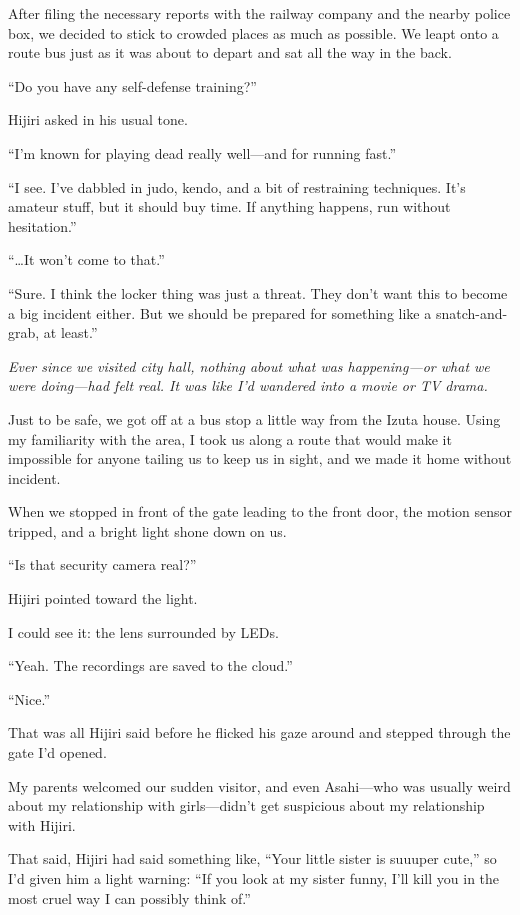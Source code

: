 \documentclass[
    a4paper,
    12pt,
    twoside,
    openany,
    UTF8,
    fontset=windows
]{ctexbook}
\begin{document}
After filing the necessary reports with the railway company and the nearby police box, we decided to stick to crowded places as much as possible. We leapt onto a route bus just as it was about to depart and sat all the way in the back.

``Do you have any self-defense training?''

Hijiri asked in his usual tone.

``I'm known for playing dead really well---and for running fast.''

``I see. I've dabbled in judo, kendo, and a bit of restraining techniques. It's amateur stuff, but it should buy time. If anything happens, run without hesitation.''

``\dots It won't come to that.''

``Sure. I think the locker thing was just a threat. They don't want this to become a big incident either. But we should be prepared for something like a snatch-and-grab, at least.''

\textit{Ever since we visited city hall, nothing about what was happening---or what we were doing---had felt real. It was like I'd wandered into a movie or TV drama.}

Just to be safe, we got off at a bus stop a little way from the Izuta house. Using my familiarity with the area, I took us along a route that would make it impossible for anyone tailing us to keep us in sight, and we made it home without incident.

When we stopped in front of the gate leading to the front door, the motion sensor tripped, and a bright light shone down on us.

``Is that security camera real?''

Hijiri pointed toward the light.

I could see it: the lens surrounded by LEDs.

``Yeah. The recordings are saved to the cloud.''

``Nice.''

That was all Hijiri said before he flicked his gaze around and stepped through the gate I'd opened.

My parents welcomed our sudden visitor, and even Asahi---who was usually weird about my relationship with girls---didn't get suspicious about my relationship with Hijiri.

That said, Hijiri had said something like, ``Your little sister is suuuper cute,'' so I'd given him a light warning: ``If you look at my sister funny, I'll kill you in the most cruel way I can possibly think of.''
\end{document}
